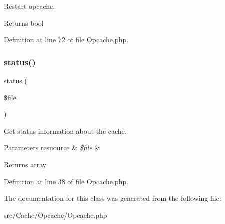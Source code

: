 Restart opcache.

\begin{DoxyReturn}{Returns}
bool 
\end{DoxyReturn}


Definition at line 72 of file Opcache.\+php.

\mbox{\label{class_zest_1_1_cache_1_1_opcache_1_1_opcache_a67c038776f18f8436abb3933f2b2611f}} 
\subsubsection{\texorpdfstring{status()}{status()}}
{\footnotesize\ttfamily status (\begin{DoxyParamCaption}\item[{}]{\$file }\end{DoxyParamCaption})}

Get status information about the cache.


\begin{DoxyParams}[1]{Parameters}
resuource & {\em \$file} & \\
\hline
\end{DoxyParams}
\begin{DoxyReturn}{Returns}
array 
\end{DoxyReturn}


Definition at line 38 of file Opcache.\+php.



The documentation for this class was generated from the following file\+:\begin{DoxyCompactItemize}
\item 
src/\+Cache/\+Opcache/Opcache.\+php\end{DoxyCompactItemize}
